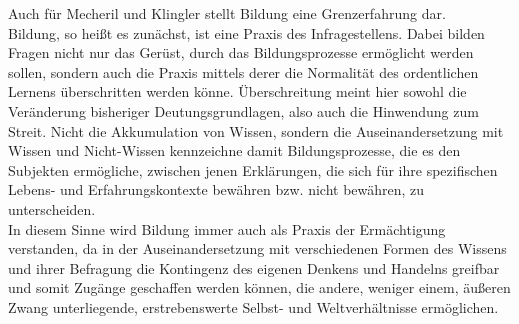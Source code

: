 Auch für Mecheril und Klingler stellt Bildung eine
Grenzerfahrung dar.\\
Bildung, so heißt es zunächst, ist eine Praxis des
Infragestellens.\footnotemark {} Dabei bilden Fragen nicht nur das Gerüst, durch das
Bildungsprozesse ermöglicht werden sollen, sondern auch die Praxis mittels
derer \glqq die Normalität des ordentlichen Lernens\grqq\footnotemark
{} überschritten werden könne.
Überschreitung meint hier sowohl die Veränderung bisheriger Deutungsgrundlagen,
also auch die Hinwendung zum Streit.\footnotemark {} Nicht die Akkumulation von Wissen,
sondern die Auseinandersetzung mit Wissen und Nicht-Wissen kennzeichne damit
Bildungsprozesse, die es den Subjekten ermögliche, zwischen jenen Erklärungen,
die sich für ihre spezifischen Lebens- und Erfahrungskontexte bewähren bzw.
nicht bewähren, zu unterscheiden.\footnotemark {}\\ 

\noindent In diesem Sinne wird Bildung immer auch als
Praxis der Ermächtigung verstanden, da in der Auseinandersetzung mit
verschiedenen Formen des Wissens und ihrer Befragung die Kontingenz des eigenen
Denkens und Handelns greifbar und somit Zugänge geschaffen werden können, die
\glqq andere, weniger einem, äußeren Zwang unterliegende, erstrebenswerte Selbst-
und Weltverhältnisse\grqq\footnotemark {}  ermöglichen.\\

